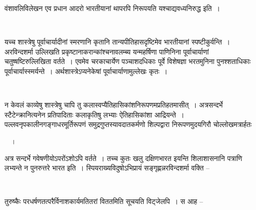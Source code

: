 वंशावलिविलेखन एव प्रधान आदरो भारतीयानां थापरपि निरूपयति यश्चाद्यवध्यनिरुद्ध इति~।

\begin{myquote}

~\hfill {}
\end{myquote}

यच्च शास्त्रेषु पूर्वाचार्यादीनां स्मरणानि कृतानि तान्यपीतिहासदृष्टिमेव भारतीयानां स्पष्टीकुर्वन्ति~। अरविन्दशर्मा उल्लिखति प्रकृष्टानाकरान्कांश्चनावलम्ब्य यन्महर्षिणा पाणिनिना पूर्वाचार्याणां चतुष्षष्टिरुल्लिखिता वर्तते~। एवमेव चरकाचार्येण पञ्चाशदधिकाः पूर्वे विशेषज्ञा भरतमुनिना पुनश्शताधिकाः पूर्वाचार्यास्स्मर्यन्ते~। अर्थशास्त्रेऽप्यनेकेषां पूर्वाचार्याणामुल्लेखः कृतः~। 

~\hfill {} 

न केवलं काव्येषु शास्त्रेषु चापि तु कलास्वप्यैतिहासिकांशनिरूपणमप्रतिहतमासीत्~। अत्रसन्दर्भे स्टैटेन्क्रानित्यनेन प्रतिपादिताः कलाकृतिषु लभ्याः ऐतिहासिकांशा आद्रियन्ते~। पल्लवनृपकालीनगङ्गाधरमूर्तिरूपणं समुद्रगुप्तस्यावदातकर्मणो शिल्पद्वारा निरूपणमुदयगिरौ चोल्लोखमत्रार्हतः 

~\hfill {}~।

अत्र सन्दर्भे गवेषणीयोऽपरोंऽशोऽपि वर्तते~। तच्च कुतः खलु दक्षिणभारत इयन्ति शिलाशासनानि पत्राणि लभ्यन्ते न पुनरुत्तरे भारत इति~। स्पियराख्यविदुषोऽभिप्रायं सङ्गृह्णन्नरविन्दशर्मा वक्ति –

\begin{myquote}

~\hfill {}
\end{myquote}

तुरुष्कैः परधर्षणतत्परैर्विनाशकार्यमतितरां विततमिति सूचयति विट्जेलपि~। स आह –

\begin{myquote}

~\hfill {}
\end{myquote}

